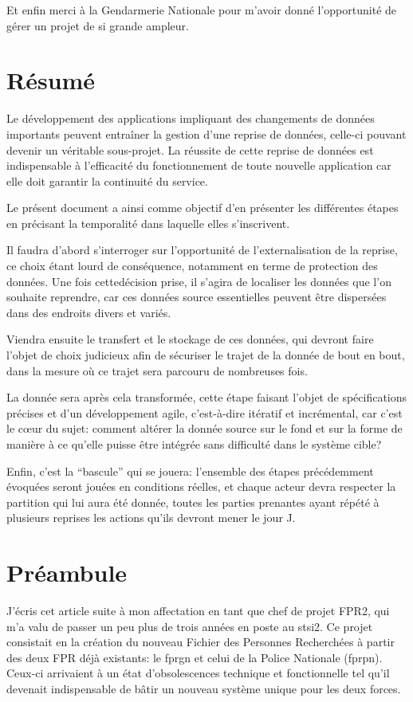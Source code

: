 \documentclass{book}
\begin{document}
Et enfin merci à la Gendarmerie Nationale pour m'avoir donné l'opportunité de gérer un projet de si grande ampleur.

\chapter*{Résumé}
Le développement des applications impliquant des changements de données importants peuvent entraîner la gestion d'une reprise de données, celle-ci pouvant devenir un véritable sous-projet. La réussite de cette reprise de données est indispensable à l'efficacité du fonctionnement de toute nouvelle application car elle doit garantir la continuité du service.

Le présent document a ainsi comme objectif d'en présenter les différentes étapes en précisant la temporalité dans laquelle elles s'inscrivent.

Il faudra d'abord s'interroger sur l'opportunité de l'externalisation de la reprise, ce choix étant lourd de conséquence, notamment en terme de protection des données. Une fois cettedécision prise, il s'agira de localiser les données que l'on souhaite reprendre, car ces données source essentielles peuvent être dispersées dans des endroits divers et variés.

Viendra ensuite le transfert et le stockage de ces données, qui devront faire l'objet de choix judicieux afin de sécuriser le trajet de la donnée de bout en bout, dans la mesure où ce trajet sera parcouru de nombreuses fois.

La donnée sera après cela transformée, cette étape faisant l'objet de spécifications précises et d'un développement agile, c'est-à-dire itératif et incrémental, car c'est le cœur du sujet: comment altérer la donnée source sur le fond et sur la forme de manière à ce qu'elle puisse être intégrée sans difficulté dans le système cible? 

Enfin, c'est la  ``bascule'' qui se jouera: l'ensemble des étapes précédemment évoquées seront jouées en conditions réelles, et chaque acteur devra respecter la partition qui lui aura été donnée, toutes les parties prenantes ayant répété à plusieurs reprises les actions qu'ils devront mener le jour J. 

\thispagestyle{empty}
\chapter*{Préambule}
J'écris cet article suite à mon affectation en tant que chef de projet FPR2, qui m'a valu de passer un peu plus de trois années en poste au \gls{stsi2}. Ce projet consistait en la création du nouveau Fichier des Personnes Recherchées à partir des deux FPR déjà existants: le \gls{fprgn} et celui de la Police Nationale (\gls{fprpn}). Ceux-ci arrivaient à un état d'obsolescences technique et fonctionnelle tel qu'il devenait indispensable de bâtir un nouveau système unique pour les deux forces.
\end{document}
